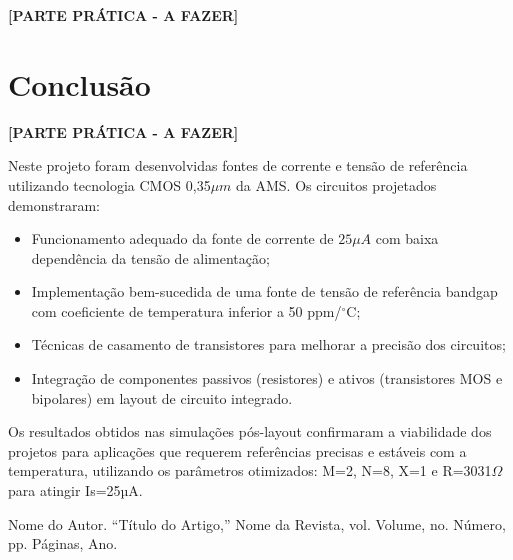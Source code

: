 \documentclass[12pt,a4paper]{article}
\newcommand{\degree}{\ensuremath{{}^\circ}}
\begin{document}
\textbf{[PARTE PRÁTICA - A FAZER]}

\section*{Conclusão}

\textbf{[PARTE PRÁTICA - A FAZER]}

Neste projeto foram desenvolvidas fontes de corrente e tensão de referência utilizando tecnologia CMOS 0,35$\mu m$ da AMS. Os circuitos projetados demonstraram:

\begin{itemize}
    \item Funcionamento adequado da fonte de corrente de $25\mu A$ com baixa dependência da tensão de alimentação;
    \item Implementação bem-sucedida de uma fonte de tensão de referência bandgap com coeficiente de temperatura inferior a 50 ppm/$\degree$C;
    \item Técnicas de casamento de transistores para melhorar a precisão dos circuitos;
    \item Integração de componentes passivos (resistores) e ativos (transistores MOS e bipolares) em layout de circuito integrado.
\end{itemize}

Os resultados obtidos nas simulações pós-layout confirmaram a viabilidade dos projetos para aplicações que requerem referências precisas e estáveis com a temperatura, utilizando os parâmetros otimizados: M=2, N=8, X=1 e R=3031$\Omega$ para atingir Is=25µA.

{}
\begin{thebibliography}{99}
     Nome do Autor. ``Título do Artigo,'' Nome da Revista, vol. Volume, no. Número, pp. Páginas, Ano.
\end{thebibliography}
\end{document}
